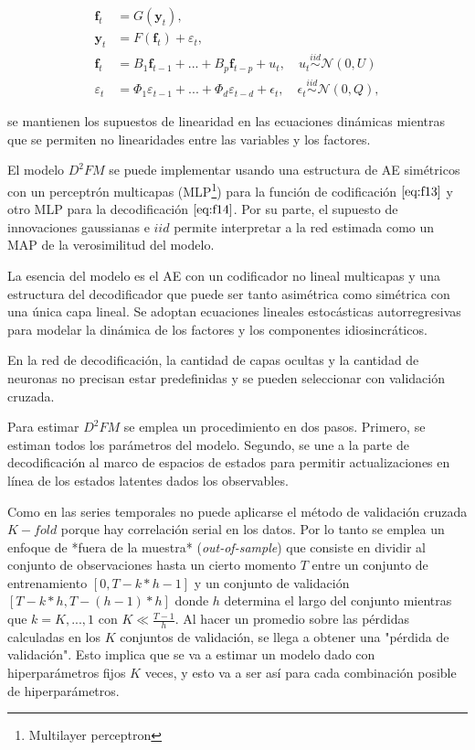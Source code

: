 \documentclass[a4paper,twoside,15pt]{article}
\begin{document}
\begin{align*}
	\textbf{f}_t&=G(\textbf{y}_t),\label{eq:f13} \tag{13}\\ 
	\textbf{y}_t&=F(\textbf{f}_t)+\varepsilon_t, \label{eq:f14} \tag{14} \\ 
	\textbf{f}_t&=B_1\textbf{f}_{t-1}+...+B_p\textbf{f}_{t-p}+u_t,\quad u_t \overset{iid}{\sim} \mathcal{N} (0,U) \label{eq:f15} \tag{15} \\
	\varepsilon_t&=\Phi_1\varepsilon_{t-1}+...+\Phi_d \varepsilon_{t-d}+ \epsilon_t,\quad \epsilon_t \overset{iid}{\sim} \mathcal{N} (0,Q)  , \label{eq:f16} \tag{16}
\end{align*}

se mantienen los supuestos de linearidad en las ecuaciones dinámicas mientras que se permiten no linearidades entre las variables y los factores.


El modelo  $D^2FM$ se puede implementar usando una estructura de AE simétricos con un perceptrón multicapas (MLP\footnote{Multilayer perceptron}) para la función de codificación $\eqref{eq:f13}$ y otro MLP para la decodificación $\eqref{eq:f14}$. 
Por su parte, el supuesto de innovaciones gaussianas e $iid$ permite interpretar a la red estimada como un MAP de la verosimilitud del modelo.

La esencia del modelo es el AE con un codificador no lineal multicapas y una estructura del decodificador que puede ser tanto asimétrica como simétrica con una única capa lineal. Se adoptan ecuaciones lineales estocásticas autorregresivas para modelar la dinámica de los factores y los componentes idiosincráticos.

En la red de decodificación, la cantidad de capas ocultas y la cantidad de neuronas no precisan estar predefinidas y se pueden seleccionar con validación cruzada. 


Para estimar $D^2FM$ se emplea un procedimiento en dos pasos. Primero, se estiman todos los parámetros del modelo. Segundo, se une a la parte de decodificación al marco de espacios de estados para permitir actualizaciones en línea de los estados latentes dados los observables.

Como en las series temporales no puede aplicarse el método de validación cruzada $K-fold$ porque hay correlación serial en los datos. Por lo tanto se emplea un enfoque de *fuera de la muestra* (\textit{out-of-sample}) que consiste en dividir al conjunto de observaciones hasta un cierto momento $T$ entre un conjunto de entrenamiento $\left [ 0,T-k\ast h-1 \right ]$ y un conjunto de validación $\left [T-k \ast h,T-(h-1) \ast h \right ]$ donde $h$ determina el largo del conjunto mientras que $k=K,...,1$ con $K \ll \frac{T-1}{h}$. Al hacer un promedio sobre las pérdidas calculadas en los $K$ conjuntos de validación, se llega a obtener una "pérdida de validación". Esto implica que se va a estimar un modelo dado con hiperparámetros fijos $K$ veces, y esto va a ser así para cada combinación posible de hiperparámetros.  
\end{document}
